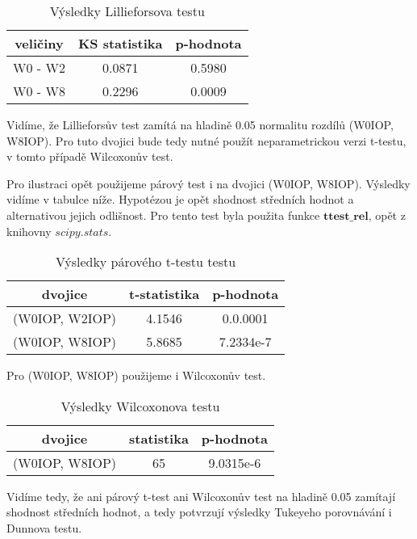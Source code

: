 \documentclass{article}
\begin{document}
\begin{table}[H]
  \small
  \centering
  \caption{Výsledky Lillieforsova testu}
  \begin{tabular}{|ccc|}
    \hline
    veličiny & KS statistika & p-hodnota\\
    \hline
    W0 - W2 & 0.0871 & 0.5980\\
    W0 - W8 & 0.2296 & 0.0009\\
    \hline
  \end{tabular}
\end{table}

Vidíme, že Lillieforsův test zamítá na hladině 0.05 normalitu rozdílů (W0IOP, W8IOP). Pro tuto dvojici bude tedy nutné použít neparametrickou verzi t-testu, v tomto
případě Wilcoxonův test.

Pro ilustraci opět použijeme párový test i na dvojici (W0IOP, W8IOP).
Výsledky vidíme v tabulce níže.
Hypotézou je opět shodnost středních hodnot a alternativou jejich odlišnost.
Pro tento test byla použita funkce $\mathbf{ttest\_rel}$, opět z knihovny $scipy.stats$.

\begin{table}[H]
  \small
  \centering
  \caption{Výsledky párového t-testu testu}
  \begin{tabular}{|ccc|}
    \hline
    dvojice & t-statistika & p-hodnota\\
    \hline
    (W0IOP, W2IOP) & 4.1546 & 0.0.0001\\
    (W0IOP, W8IOP) & 5.8685 & 7.2334e-7\\
    \hline
  \end{tabular}
\end{table}

Pro (W0IOP, W8IOP) použijeme i Wilcoxonův test.

\begin{table}[H]
  \small
  \centering
  \caption{Výsledky Wilcoxonova testu}
  \begin{tabular}{|ccc|}
    \hline
    dvojice & statistika & p-hodnota\\
    \hline
    (W0IOP, W8IOP) & 65 & 9.0315e-6\\
    \hline
  \end{tabular}
\end{table}

Vidíme tedy, že ani párový t-test ani Wilcoxonův test na hladině 0.05 zamítají shodnost středních hodnot, a tedy potvrzují výsledky Tukeyeho porovnávání i Dunnova testu.
\end{document}
